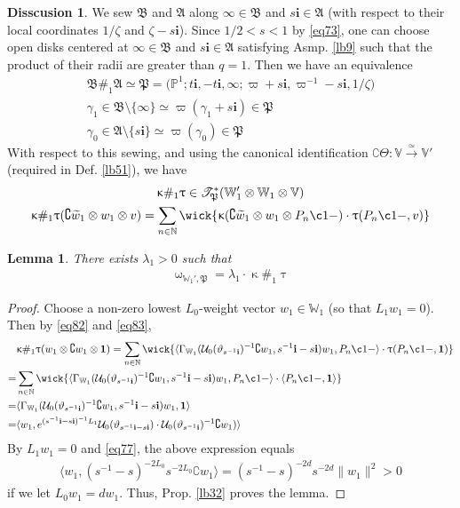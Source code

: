 \documentclass[11pt,b5paper,notitlepage]{article}
\theoremstyle{definition}
\newtheorem{diss}[df]{Disscusion}
\theoremstyle{plain}
\newtheorem{lm}[df]{Lemma}
\newcommand{\fk}{\mathfrak}
\newcommand{\mc}{\mathcal}
\newcommand{\wtd}{\widetilde}
\newcommand{\id}{\mathbf{1}}
\newcommand{\bk}[1]{\langle {#1}\rangle}
\newcommand{\scr}{\mathscr}
\newcommand{\im}{\mathbf{i}}
\newcommand{\Co}{\complement}
\newcommand{\Vbb}{\mathbb V}
\newcommand{\Wbb}{\mathbb W}
\newcommand{\Nbb}{\mathbb N}
\newcommand{\Pbb}{\mathbb P}
\numberwithin{equation}{section}
\begin{document}
\begin{diss}\label{lb53}
We sew $\fk B$ and $\fk A$ along $\infty\in\fk B$ and $s\im\in\fk A$ (with respect to their local coordinates $1/\zeta$ and $\zeta-s\im$). Since $1/2<s<1$ by \eqref{eq73}, one can choose open disks centered at $\infty\in\fk B$ and $s\im\in\fk A$ satisfying Asmp. \ref{lb9} such that the product of their radii are greater than $q=1$. Then we have an equivalence
\begin{gather*}
\fk B\#_1\fk A\simeq \fk P=\big(\Pbb^1;t\im,-t\im,\infty;\varpi+s\im,\varpi^{-1}-s\im,1/\zeta\big)\\
\gamma_1\in\fk B\setminus\{\infty\}\simeq \varpi(\gamma_1+s\im)\in\fk P\\
\gamma_0\in\fk A\setminus\{s\im\}\simeq \varpi(\gamma_0)\in\fk P
\end{gather*}
With respect to this sewing, and using the canonical identification $\Co\Theta:\Vbb\xrightarrow{\simeq}\Vbb'$ (required in Def. \ref{lb51}), we have
\begin{gather*}
\upkappa\#_1\uptau\in\scr T_{\fk P}^*(\Wbb_1'\otimes\Wbb_1\otimes\Vbb)\\
\upkappa\#_1\uptau(\Co\wtd w_1\otimes w_1\otimes v)=\sum_{n\in\Nbb} \wick{\upkappa(\Co\wtd w_1\otimes w_1\otimes P_n\c1 -)\cdot \uptau(P_n\c1 -,v)}
\end{gather*}
\end{diss}

\begin{lm}\label{lb56}
There exists $\lambda_1>0$ such that
\begin{align}
\upomega_{\Wbb_1',\fk P}=\lambda_1 \cdot \upkappa\#_1\uptau
\end{align}
\end{lm}

\begin{proof}
Choose a non-zero lowest $L_0$-weight vector $w_1\in\Wbb_1$ (so that $L_1w_1=0$). Then by \eqref{eq82} and \eqref{eq83},
\begin{align*}
&\upkappa\#_1\uptau(w_1\otimes\Co w_1\otimes\id)=\sum_{n\in\Nbb}\wick{\langle \Gamma_{\Wbb_1}(\mc U_0(\vartheta_{s^{-1}\im})^{-1}\Co w_1,s^{-1}\im-s\im)w_1,P_n\c1 -\rangle\cdot \uptau(P_n\c1 -,\id)}\\
=&\sum_{n\in\Nbb}\wick{\langle \Gamma_{\Wbb_1}(\mc U_0(\vartheta_{s^{-1}\im})^{-1}\Co w_1,s^{-1}\im-s\im)w_1,P_n\c1 -\rangle\cdot \langle P_n\c1 -,\id\rangle}\\
=&\bk{\Gamma_{\Wbb_1}(\mc U_0(\vartheta_{s^{-1}\im})^{-1}\Co w_1,s^{-1}\im-s\im)w_1,\id}\\
=&\bk{w_1,e^{(s^{-1}\im-s\im)^{-1}L_1}\mc U_0(\vartheta_{s^{-1}\im-s\im})\cdot\mc U_0(\vartheta_{s^{-1}\im})^{-1}\Co w_1 ) }
\end{align*}
By $L_1w_1=0$ and \eqref{eq77}, the above expression equals
\begin{align*}
\bk{w_1,(s^{-1}-s)^{-2L_0}s^{-2L_0}\Co w_1}=(s^{-1}-s)^{-2d}s^{-2d}\lVert w_1\lVert^2> 0
\end{align*}
if we let $L_0w_1=dw_1$. Thus, Prop. \ref{lb32} proves the lemma.
\end{proof}
\end{document}
